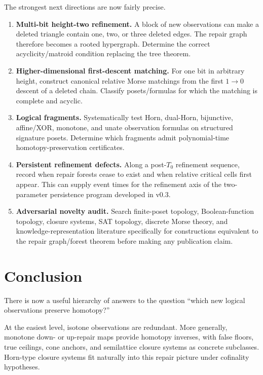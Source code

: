 \documentclass[11pt]{article}
\theoremstyle{definition}
\begin{document}
The strongest next directions are now fairly precise.

\begin{enumerate}[label=\textbf{N\arabic*.},leftmargin=2.6em]
\item \textbf{Multi-bit height-two refinement.} A block of new observations can make a deleted triangle contain one, two, or three deleted edges. The repair graph therefore becomes a rooted hypergraph. Determine the correct acyclicity/matroid condition replacing the tree theorem.

\item \textbf{Higher-dimensional first-descent matching.} For one bit in arbitrary height, construct canonical relative Morse matchings from the first $1\to0$ descent of a deleted chain. Classify posets/formulas for which the matching is complete and acyclic.

\item \textbf{Logical fragments.} Systematically test Horn, dual-Horn, bijunctive, affine/XOR, monotone, and unate observation formulas on structured signature posets. Determine which fragments admit polynomial-time homotopy-preservation certificates.

\item \textbf{Persistent refinement defects.} Along a post-$T_0$ refinement sequence, record when repair forests cease to exist and when relative critical cells first appear. This can supply event times for the refinement axis of the two-parameter persistence program developed in v0.3.

\item \textbf{Adversarial novelty audit.} Search finite-poset topology, Boolean-function topology, closure systems, SAT topology, discrete Morse theory, and knowledge-representation literature specifically for constructions equivalent to the repair graph/forest theorem before making any publication claim.
\end{enumerate}

\section{Conclusion}

There is now a useful hierarchy of answers to the question ``which new logical observations preserve homotopy?''

At the easiest level, isotone observations are redundant. More generally, monotone down- or up-repair maps provide homotopy inverses, with false floors, true ceilings, cone anchors, and semilattice closure systems as concrete subclasses. Horn-type closure systems fit naturally into this repair picture under cofinality hypotheses.
\end{document}
